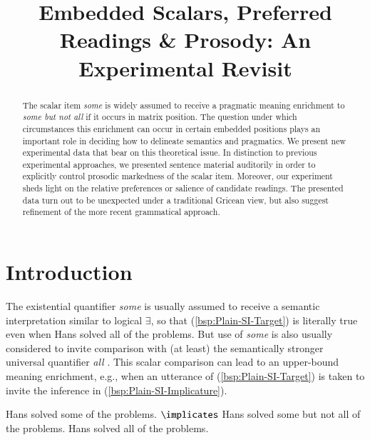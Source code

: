\documentclass[fleqn,reqno,10pt]{article}
\title{Embedded Scalars, Preferred Readings \& Prosody: {A}n
  Experimental Revisit}
\author{%
}
\date{}
\begin{document}
\maketitle



\begin{abstract}
  The scalar item \emph{some} is widely assumed to receive a pragmatic
  meaning enrichment to \emph{some but not all} if it occurs in matrix
  position. The question under which circumstances this enrichment can
  occur in certain embedded positions plays an important role in
  deciding how to delineate semantics and pragmatics. %
  We present new experimental data that bear on this theoretical
  issue. In distinction to previous experimental approaches, we
  presented sentence material auditorily in order to explicitly
  control prosodic markedness of the scalar item. Moreover, our
  experiment sheds light on the relative preferences or salience of
  candidate readings. The presented data turn out to be unexpected
  under a traditional Gricean view, but also suggest refinement of the
  more recent grammatical approach.
\end{abstract}




\section{Introduction}
\label{sec:introduction}

The existential quantifier \emph{some} is usually assumed to receive a
semantic interpretation similar to logical $\exists$, so that
(\ref{bsp:Plain-SI-Target}) is literally true even when Hans solved
all of the problems. But use of \emph{some} is also usually considered
to invite comparison with (at least) the semantically stronger
universal quantifier \emph{all}
\citep[c.f.][]{Horn1972:On-the-Semantic,Gazdar1979:Pragmatics:-Imp,AtlasLevinson1981}. This
scalar comparison can lead to an upper-bound meaning enrichment, e.g.,
when an utterance of (\ref{bsp:Plain-SI-Target}) is taken to invite
the inference in (\ref{bsp:Plain-SI-Implicature}).

\begin{exe}
  \ex \label{bsp:Plain-SI}
    \begin{xlist}
      \ex \label{bsp:Plain-SI-Target} Hans solved some of the
        problems.
      \ex \label{bsp:Plain-SI-Implicature} $\implicates$ Hans solved
        some but not all of the problems.
      \ex \label{bsp:Plain-SI-Alternative} Hans solved all of the problems.
    \end{xlist}
\end{exe}
\end{document}
